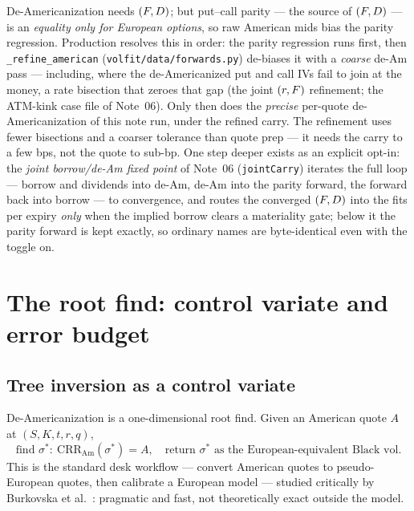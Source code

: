\documentclass[11pt]{article}
\begin{document}
\begin{remark}
De-Americanization needs $(F,D)$; but put--call parity --- the source of
$(F,D)$ --- is an \emph{equality only for European options}, so raw American
mids bias the parity regression. Production resolves this in order: the parity
regression runs first, then \texttt{\_refine\_american}
(\texttt{volfit/data/forwards.py}) de-biases it with a \emph{coarse} de-Am pass
--- including, where the de-Americanized put and call IVs fail to join at the
money, a rate bisection that zeroes that gap (the joint $(r,F)$ refinement;
the ATM-kink case file of Note~06). Only then does the \emph{precise} per-quote
de-Americanization of this note run, under the refined carry. The refinement
uses fewer bisections and a coarser tolerance than quote prep --- it needs the
carry to a few bps, not the quote to sub-bp. One step deeper exists as an
explicit opt-in: the \emph{joint borrow/de-Am fixed point} of Note~06
(\texttt{jointCarry}) iterates the full loop --- borrow and dividends into
de-Am, de-Am into the parity forward, the forward back into borrow --- to
convergence, and routes the converged $(F,D)$ into the fits per expiry
\emph{only} when the implied borrow clears a materiality gate; below it the
parity forward is kept exactly, so ordinary names are byte-identical even
with the toggle on.
\end{remark}

\section{The root find: control variate and error budget}
\label{sec:map}

\subsection{Tree inversion as a control variate}

De-Americanization is a one-dimensional root find. Given an American quote $A$
at $(S,K,t,r,q)$,
\begin{equation}
\boxed{\;\text{find }\sigma^*:\ \text{CRR}_{\text{Am}}(\sigma^*)=A,\quad
\text{return }\sigma^*\text{ as the European-equivalent Black vol.}\;}
\label{eq:deam}
\end{equation}
This is the standard desk workflow --- convert American quotes to
pseudo-European quotes, then calibrate a European model --- studied critically
by Burkovska et al.~\cite{Burkovska2018}: pragmatic and fast, not theoretically
exact outside the model.
\end{document}
